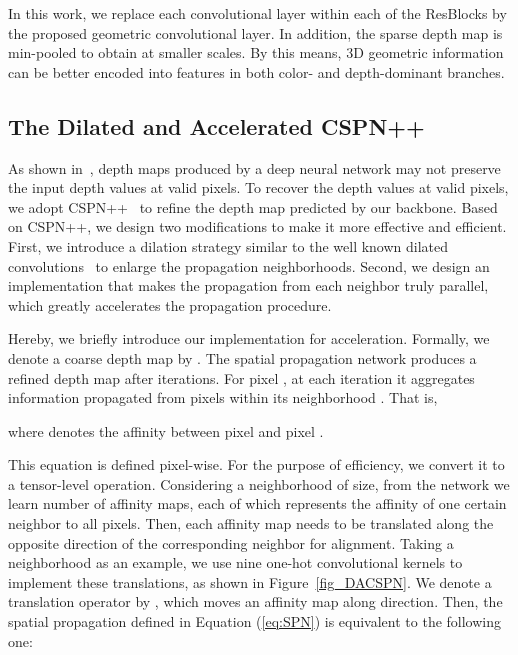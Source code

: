 \documentclass[letterpaper, 10 pt, conference]{ieeeconf}
\begin{document}
In this work, we replace each convolutional layer within each of the ResBlocks by the proposed geometric convolutional layer. In addition, the sparse depth map is min-pooled to obtain  at smaller scales. By this means, 3D geometric information can be better encoded into features in both color- and depth-dominant branches.











\subsection{The Dilated and Accelerated CSPN++}
\label{sec:DA-CSPN++}


As shown in~\cite{Cheng2018CSPN}, depth maps produced by a deep neural network may not preserve the input depth values at valid pixels. To recover the depth values at valid pixels, we adopt CSPN++~\cite{Cheng2020CSPN++} to refine the depth map predicted by our backbone. Based on CSPN++, we design two modifications to make it more effective and efficient. First, we introduce a dilation strategy similar to the well known dilated convolutions~\cite{Yu2016} to enlarge the propagation neighborhoods. Second, we design an implementation that makes the propagation from each neighbor truly parallel, which greatly accelerates the propagation procedure.






Hereby, we briefly introduce our implementation for acceleration. Formally, we denote a coarse depth map by . The spatial propagation network produces a refined depth map  after  iterations. For pixel , at each iteration it aggregates information propagated from pixels within its neighborhood . That is,

where  denotes the affinity between pixel  and pixel .

This equation is defined pixel-wise. For the purpose of efficiency, we convert it to a tensor-level operation. Considering a neighborhood of  size, from the network we learn  number of affinity maps, each of which represents the affinity of one certain neighbor to all pixels. 
Then, each affinity map needs to be translated along the opposite direction of the corresponding neighbor for alignment. Taking a  neighborhood as an example, we use nine one-hot convolutional kernels to implement these translations, as shown in Figure~\ref{fig_DACSPN}. We denote a translation operator by , which moves an affinity map  along  direction. Then, the spatial propagation defined in Equation (\ref{eq:SPN}) is equivalent to the following one:
\end{document}
